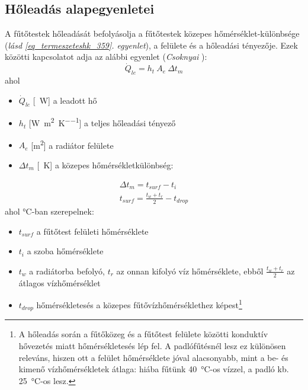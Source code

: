 

\subsection{Hőleadás alapegyenletei}
A fűtőtestek hőleadását befolyásolja a fűtőtestek közepes hőmérséklet-különbsége (\textit{lásd \ref{eq_termeszeteshk_359}. egyenlet}), a felülete és a hőleadási tényezője.
%
Ezek közötti kapcsolatot adja az alábbi egyenlet (\textit{Csoknyai} \cite[358.~o.]{Herz}): 
\begin{equation} \label{eq_holeadas}
\dot Q_{le} = h_t ~ A_e ~ \Delta t_m
\end{equation}
%
%
ahol
\begin{itemize}[itemsep=6pt,topsep=0pt,parsep=0pt,partopsep=0pt]
\item[] $\dot{Q}_{le}$ [\SI{}{\watt}] a leadott hő
\item[] $h_t$ [\si[per-mode = fraction]{\watt\per\meter\squared\per\kelvin}] a teljes hőleadási tényező %
\item[] $A_e$ [\si{\metre\squared}] a radiátor felülete
\item[] $\Delta t_m$ [\SI{}{\kelvin}] a közepes hőmérsékletkülönbség:
\end{itemize}
%
\begin{equation} \label{eq_termeszeteshk_359}
\begin{aligned}
\Delta t_m = t_{surf} - t_i \\[10pt]
t_{surf} = \frac{t_w+t_r}{2} -t_{drop}
\end{aligned}
\end{equation}
ahol \si{\celsius}-ban szerepelnek:
%
\begin{itemize}[itemsep=6pt,topsep=0pt,parsep=0pt,partopsep=0pt]
	\item[] $t_{surf}$ a fűtőtest felületi hőmérséklete
	\item[] $t_i$ a szoba hőmérséklete
	\item[] $t_w$ a radiátorba befolyó, $t_r$ az onnan kifolyó víz hőmérséklete, ebből $\frac{t_w+t_r}{2}$ az átlagos vízhőmérséklet
	\item[] $t_{drop}$ hőmérsékletesés a közepes fűtővízhőmérséklethez képest\footnote{A hőleadás során a fűtőközeg és a fűtőtest felülete közötti konduktív hővezetés miatt hőmérsékletesés lép fel. A padlófűtésnél lesz ez különösen releváns, hiszen ott a felület hőmérséklete jóval alacsonyabb, mint a be- és kimenő vízhőmérsékletek átlaga: hiába fűtünk \SI{40}{\celsius}-os vízzel, a padló kb. \SI{25}{\celsius}-os lesz.}
\end{itemize}
